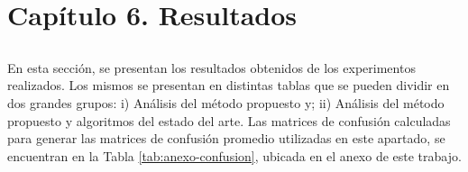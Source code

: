 \chapter*{Capítulo 6. \textbf{Resultados}}\label{ch:resultados}

\section*{}
\addtocounter{section}{1}
\setcounter{subsection}{0}

En esta sección, se presentan los resultados obtenidos de los experimentos realizados. Los mismos se presentan en distintas tablas que se pueden dividir en dos grandes grupos: i) Análisis del método propuesto y; ii) Análisis del método propuesto y algoritmos del estado del arte. Las matrices de confusión calculadas para generar las matrices de confusión promedio utilizadas en este apartado, se encuentran en la Tabla \ref{tab:anexo-confusion}, ubicada en el anexo de este trabajo.






